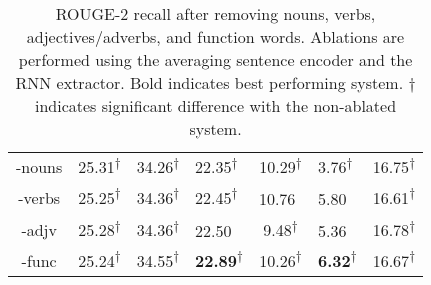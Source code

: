 \begin{table*}[ht]
\begin{tabular}{cgcgcgc}
    -nouns & 25.31\textsuperscript{$\dagger$} & 34.26\textsuperscript{$\dagger$} & 22.35\textsuperscript{$\dagger$} & 10.29\textsuperscript{$\dagger$} & 3.76\textsuperscript{$\dagger$} & 16.75\textsuperscript{$\dagger$}\\
    -verbs & 25.25\textsuperscript{$\dagger$} & 34.36\textsuperscript{$\dagger$} & 22.45\textsuperscript{$\dagger$} & 10.76\textsuperscript{~} & 5.80\textsuperscript{~} & 16.61\textsuperscript{$\dagger$}\\
    -adjv & 25.28\textsuperscript{$\dagger$} & 34.36\textsuperscript{$\dagger$} & 22.50\textsuperscript{~} & 9.48\textsuperscript{$\dagger$} & 5.36\textsuperscript{~} & 16.78\textsuperscript{$\dagger$}\\
    -func & 25.24\textsuperscript{$\dagger$} & 34.55\textsuperscript{$\dagger$} & \textbf{22.89}\textsuperscript{$\dagger$} & 10.26\textsuperscript{$\dagger$} & \textbf{6.32}\textsuperscript{$\dagger$} & 16.67\textsuperscript{$\dagger$}\\
    \bottomrule
\end{tabular}



\caption{ROUGE-2 recall after removing nouns, verbs, adjectives/adverbs, and 
    function words. Ablations are
    performed using the averaging sentence encoder and the RNN
extractor. 
Bold indicates best performing system. $\dagger$ indicates significant 
difference with the non-ablated system.}
\label{tab:ablations}
\end{table*}

%
